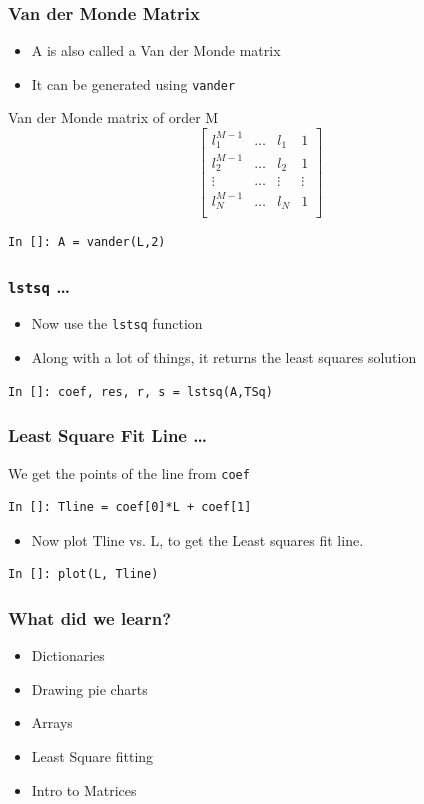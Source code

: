 \documentclass[14pt,compress]{beamer}
\newcommand{\typ}[1]{\lstinline{#1}}
\begin{document}
\begin{frame}[fragile]
\frametitle{Van der Monde Matrix}
\begin{itemize}
\item A is also called a Van der Monde matrix
\item It can be generated using \typ{vander}
\end{itemize}
Van der Monde matrix of order M
\begin{equation*}
  \begin{bmatrix}
  l_1^{M-1} & \ldots & l_1 & 1 \\
  l_2^{M-1} & \ldots &l_2 & 1 \\
  \vdots & \ldots & \vdots & \vdots\\
  l_N^{M-1} & \ldots & l_N & 1 \\
  \end{bmatrix}
\end{equation*}
\begin{lstlisting}
In []: A = vander(L,2)
\end{lstlisting}
\end{frame}

\begin{frame}[fragile]
\frametitle{\typ{lstsq} \ldots}
\begin{itemize}
\item Now use the \typ{lstsq} function
\item Along with a lot of things, it returns the least squares solution
\end{itemize}
\begin{lstlisting}
In []: coef, res, r, s = lstsq(A,TSq)
\end{lstlisting}
\end{frame}

\begin{frame}[fragile]
\frametitle{Least Square Fit Line \ldots}
We get the points of the line from \typ{coef}
\begin{lstlisting}
In []: Tline = coef[0]*L + coef[1]
\end{lstlisting}
\begin{itemize}
\item Now plot Tline vs. L, to get the Least squares fit line. 
\end{itemize}
\begin{lstlisting}
In []: plot(L, Tline)
\end{lstlisting}
\end{frame}

\begin{frame}[fragile]
  \frametitle{What did we learn?}
  \begin{itemize}
   \item Dictionaries
   \item Drawing pie charts
   \item Arrays
   \item Least Square fitting
   \item Intro to Matrices
  \end{itemize}
\end{frame}
\end{document}
